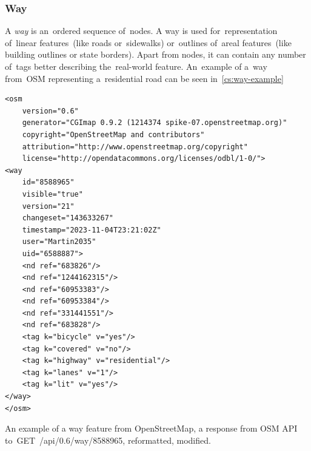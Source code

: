 \subsubsection{Way}
\label{subsec:Way}
A \textit{way} is an~ordered sequence of~nodes. A way is used for~representation of~linear features~(like roads or~sidewalks) or~outlines of~areal features~(like building outlines or state borders). Apart from nodes, it can contain any number of~tags better describing the~real-world feature. An~example of a~way from~OSM representing a~residential road can be seen in~\autoref{cs:way-example}
\begin{listing}[ht!]
\begin{verbatim}
<osm
    version="0.6"
    generator="CGImap 0.9.2 (1214374 spike-07.openstreetmap.org)"
    copyright="OpenStreetMap and contributors"
    attribution="http://www.openstreetmap.org/copyright"
    license="http://opendatacommons.org/licenses/odbl/1-0/">
<way 
    id="8588965"
    visible="true"
    version="21"
    changeset="143633267"
    timestamp="2023-11-04T23:21:02Z"
    user="Martin2035"
    uid="6588887">
    <nd ref="683826"/>
    <nd ref="1244162315"/>
    <nd ref="60953383"/>
    <nd ref="60953384"/>
    <nd ref="331441551"/>
    <nd ref="683828"/>
    <tag k="bicycle" v="yes"/>
    <tag k="covered" v="no"/>
    <tag k="highway" v="residential"/>
    <tag k="lanes" v="1"/>
    <tag k="lit" v="yes"/>
</way>
</osm>
\end{verbatim}
\caption[An example of a way feature from OpenStreetMap]{An example of a way feature from OpenStreetMap, a response from OSM API to~GET~/api/0.6/way/8588965, reformatted, modified.}
\label{cs:way-example}
\end{listing}
